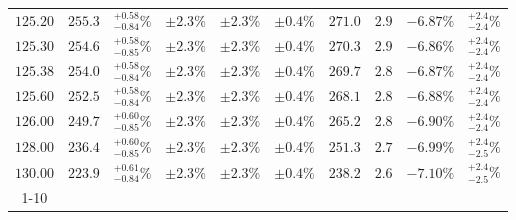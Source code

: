 \begin{table}[ht!]
{{\begin{tabular}{| cc | c | ccc | ccc | c |}
$125.20$ & $255.3$ & $^{+0.58}_{-0.84}\%$ & $\pm 2.3\%$ & {\color{black!55}$\pm 2.3\%$} & {\color{black!55}$\pm 0.4\%$} & $271.0$ & $2.9$ & $-6.87\%$ & $^{+2.4}_{-2.4}\%$ \\
$125.30$ & $254.6$ & $^{+0.58}_{-0.85}\%$ & $\pm 2.3\%$ & {\color{black!55}$\pm 2.3\%$} & {\color{black!55}$\pm 0.4\%$} & $270.3$ & $2.9$ & $-6.86\%$ & $^{+2.4}_{-2.4}\%$ \\
$125.38$ & $254.0$ & $^{+0.58}_{-0.84}\%$ & $\pm 2.3\%$ & {\color{black!55}$\pm 2.3\%$} & {\color{black!55}$\pm 0.4\%$} & $269.7$ & $2.8$ & $-6.87\%$ & $^{+2.4}_{-2.4}\%$ \\
$125.60$ & $252.5$ & $^{+0.58}_{-0.84}\%$ & $\pm 2.3\%$ & {\color{black!55}$\pm 2.3\%$} & {\color{black!55}$\pm 0.4\%$} & $268.1$ & $2.8$ & $-6.88\%$ & $^{+2.4}_{-2.4}\%$ \\
$126.00$ & $249.7$ & $^{+0.60}_{-0.85}\%$ & $\pm 2.3\%$ & {\color{black!55}$\pm 2.3\%$} & {\color{black!55}$\pm 0.4\%$} & $265.2$ & $2.8$ & $-6.90\%$ & $^{+2.4}_{-2.4}\%$ \\
$128.00$ & $236.4$ & $^{+0.60}_{-0.85}\%$ & $\pm 2.3\%$ & {\color{black!55}$\pm 2.3\%$} & {\color{black!55}$\pm 0.4\%$} & $251.3$ & $2.7$ & $-6.99\%$ & $^{+2.4}_{-2.5}\%$ \\
$130.00$ & $223.9$ & $^{+0.61}_{-0.84}\%$ & $\pm 2.3\%$ & {\color{black!55}$\pm 2.3\%$} & {\color{black!55}$\pm 0.4\%$} & $238.2$ & $2.6$ & $-7.10\%$ & $^{+2.4}_{-2.5}\%$ \\
\cline{1-10}
\end{tabular}
}
}
\end{table}

